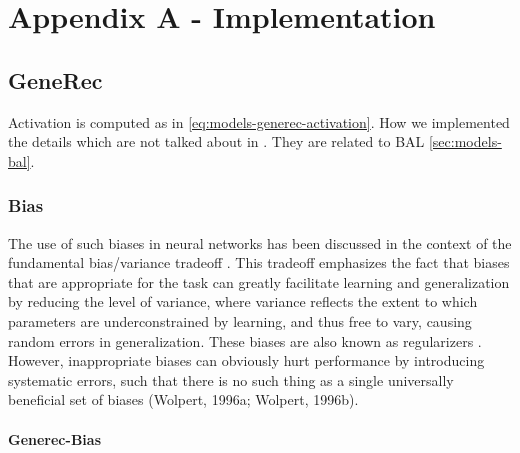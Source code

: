 
\section*{Appendix A - Implementation}
\appendix
{}
\label{sec:appendix-impl} 



\subsection{GeneRec} 
\label{sec:appendix-impl-generec} 

Activation is computed as in \ref{eq:models-generec-activation}. How we implemented the details which are not talked about in \citet{o1996bio}. They are related to BAL \ref{sec:models-bal}. 

\subsubsection{Bias} 
The use of such biases in neural networks has been discussed in the context of the fundamental bias/variance tradeoff \citet{geman1992neural}. This tradeoff emphasizes the fact that biases that are appropriate for the task can greatly facilitate learning and generalization by reducing the level of variance, where variance reflects the extent to which parameters are underconstrained by learning, and thus free to vary, causing random errors in generalization. These biases are also known as regularizers \citet{poggio1990networks}. However, inappropriate biases can obviously hurt performance by introducing systematic errors, such that there is no such thing as a single universally beneficial set of biases (Wolpert, 1996a; Wolpert, 1996b). 


\paragraph{Generec-Bias} 

